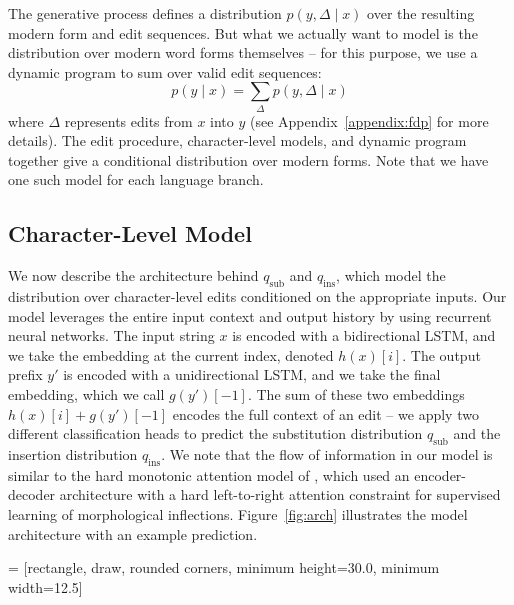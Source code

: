 \documentclass[11pt]{article}
\begin{document}
The generative process defines a distribution $p(y, \Delta \mid x)$ over the resulting modern form and edit sequences. But what we actually want to model is the distribution over modern word forms themselves -- for this purpose, we use a dynamic program to sum over valid edit sequences: $$p(y\mid x) = \sum_{\Delta} p(y, \Delta \mid x)$$
where $\Delta$ represents edits from $x$ into $y$ (see Appendix~\ref{appendix:fdp} for more details). The edit procedure, character-level models, and dynamic program together give a conditional distribution over modern forms. Note that we have one such model for each language branch. 

\subsection{Character-Level Model}
\label{sec:editmodel}

We now describe the architecture behind $q_{\text{sub}}$ and $q_{\text{ins}}$, which model the distribution over character-level edits conditioned on the appropriate inputs. Our model leverages the entire input context and output history by using recurrent neural networks. The input string $x$ is encoded with a bidirectional LSTM, and we take the embedding at the current index, denoted $h(x)[i]$. The output prefix $y'$ is encoded with a unidirectional LSTM, and we take the final embedding, which we call $g(y')[-1]$. The sum of these two embeddings $h(x)[i] + g(y')[-1]$ encodes the full context of an edit -- we apply two different classification heads to predict the substitution distribution $q_{\text{sub}}$ and the insertion distribution $q_{\text{ins}}$.
We note that the flow of information in our model is similar to the hard monotonic attention model of \citet{DBLP:journals/corr/AharoniG16}, which used an encoder-decoder architecture with a hard left-to-right attention constraint for supervised learning of morphological inflections. Figure~\ref{fig:arch} illustrates the model architecture with an example prediction.

 = [rectangle, draw, rounded corners, minimum height=30.0, minimum width=12.5]
\end{document}
